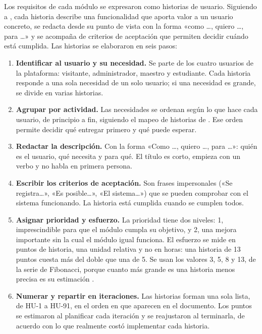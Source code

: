 Los requisitos de cada módulo se expresaron como historias de usuario. Siguiendo a \textcite{cohn2004}, cada historia describe una funcionalidad que aporta valor a un usuario concreto, se redacta desde su punto de vista con la forma «como \ldots, quiero \ldots, para \ldots» y se acompaña de criterios de aceptación que permiten decidir cuándo está cumplida. Las historias se elaboraron en seis pasos:

\begin{enumerate}
\item \textbf{Identificar al usuario y su necesidad.} Se parte de los cuatro usuarios de la plataforma: visitante, administrador, maestro y estudiante. Cada historia responde a una sola necesidad de un solo usuario; si una necesidad es grande, se divide en varias historias.
\item \textbf{Agrupar por actividad.} Las necesidades se ordenan según lo que hace cada usuario, de principio a fin, siguiendo el mapeo de historias de \textcite{patton2014}. Ese orden permite decidir qué entregar primero y qué puede esperar.
\item \textbf{Redactar la descripción.} Con la forma «Como \ldots, quiero \ldots, para \ldots»: quién es el usuario, qué necesita y para qué. El título es corto, empieza con un verbo y no habla en primera persona.
\item \textbf{Escribir los criterios de aceptación.} Son frases impersonales («Se registra\ldots», «Es posible\ldots», «El sistema\ldots») que se pueden comprobar con el sistema funcionando. La historia está cumplida cuando se cumplen todos.
\item \textbf{Asignar prioridad y esfuerzo.} La prioridad tiene dos niveles: 1, imprescindible para que el módulo cumpla su objetivo, y 2, una mejora importante sin la cual el módulo igual funciona. El esfuerzo se mide en puntos de historia, una unidad relativa y no en horas: una historia de 13 puntos cuesta más del doble que una de 5. Se usan los valores 3, 5, 8 y 13, de la serie de Fibonacci, porque cuanto más grande es una historia menos precisa es su estimación \parencite{cohn2004}.
\item \textbf{Numerar y repartir en iteraciones.} Las historias forman una sola lista, de HU-1 a HU-91, en el orden en que aparecen en el documento. Los puntos se estimaron al planificar cada iteración y se reajustaron al terminarla, de acuerdo con lo que realmente costó implementar cada historia.
\end{enumerate}


